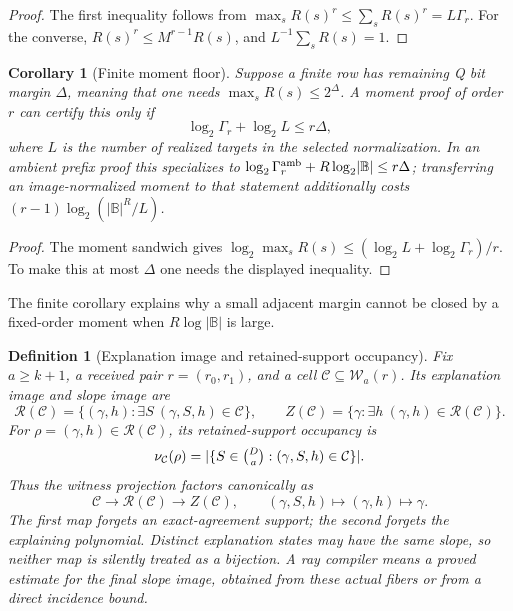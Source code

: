 \documentclass[12pt,a4paper]{amsart}
\numberwithin{equation}{section}
\newtheorem{corollary}[corollary]{Corollary}
\newtheorem{definition}[definition]{Definition}
\theoremstyle{remark}
\newcommand{\B}{\mathbb B}
\newcommand{\Ccal}{\mathcal C}
\newcommand{\Rcal}{\mathcal R}
\newcommand{\Wcal}{\mathcal W}
\newcommand{\abs}[1]{\lvert #1\rvert}
\begin{document}
\begin{proof}
The first inequality follows from \(\max_sR(s)^r\le\sum_sR(s)^r=L\Gamma_r\).  For the converse, \(R(s)^r\le M^{r-1}R(s)\), and \(L^{-1}\sum_sR(s)=1\).
\end{proof}

\begin{corollary}[Finite moment floor]\label{cor:finite-moment-floor}
Suppose a finite row has remaining Q bit margin \(\Delta\), meaning that one needs \(\max_sR(s)\le2^\Delta\).  A moment proof of order \(r\) can certify this only if
\[
        \log_2\Gamma_r+\log_2 L\le r\Delta,
\]
where \(L\) is the number of realized targets in the selected
normalization.  In an ambient prefix proof this specializes to
\(\log_2\Gamma_r^{\rm amb}+R\log_2\abs\B\le r\Delta\); transferring an
image-normalized moment to that statement additionally costs
\((r-1)\log_2(\abs\B^R/L)\).
\end{corollary}

\begin{proof}
The moment sandwich gives \(\log_2\max_sR(s)\le(\log_2L+\log_2\Gamma_r)/r\).  To make this at most \(\Delta\) one needs the displayed inequality.
\end{proof}

The finite corollary explains why a small adjacent margin cannot be closed
by a fixed-order moment when \(R\log\abs\B\) is large.

\begin{definition}[Explanation image and retained-support occupancy]
\label{def:explanation-occupancy}
Fix \(a\ge k+1\), a received pair \(r=(r_0,r_1)\), and a cell
\(\Ccal\subseteq\Wcal_a(r)\).  Its \emph{explanation image} and
\emph{slope image} are
\[
 \Rcal(\Ccal)=\{(\gamma,h):\exists S\ (\gamma,S,h)\in\Ccal\},
 \qquad Z(\Ccal)=\{\gamma:\exists h\ (\gamma,h)\in\Rcal(\Ccal)\}.
\]
For \(\rho=(\gamma,h)\in\Rcal(\Ccal)\), its
\emph{retained-support occupancy} is
\[
 \nu_{\Ccal}(\rho)
   =\abs{\{S\in\tbinom Da:(\gamma,S,h)\in\Ccal\}}.
\]
Thus the witness projection factors canonically as
\[
 \Ccal\longrightarrow\Rcal(\Ccal)\longrightarrow Z(\Ccal),
 \qquad (\gamma,S,h)\longmapsto(\gamma,h)\longmapsto\gamma.
\]
The first map forgets an exact-agreement support; the second forgets the
explaining polynomial.  Distinct explanation states may have the same
slope, so neither map is silently treated as a bijection.  A
\emph{ray compiler} means a proved estimate for the final slope image,
obtained from these actual fibers or from a direct incidence bound.
\end{definition}
\end{document}

